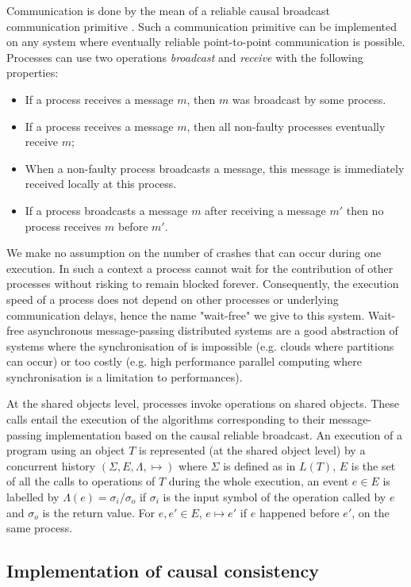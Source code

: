\documentclass[9pt,numbers]{sigplanconf}
\begin{document}
Communication is done by the mean of a reliable causal broadcast communication primitive \cite{HT93}. 
Such a communication primitive can be implemented on any system where eventually reliable point-to-point 
communication is possible. Processes can use two operations \emph{broadcast} and \emph{receive} with the 
following properties: 
\begin{itemize}
\item If a process receives a message $m$, then $m$ was broadcast by some process.
\item If a process receives a message $m$, then all non-faulty processes eventually receive $m$;
\item When a non-faulty process broadcasts a message, this message is immediately received locally at this process.
\item If a process broadcasts a message $m$ after receiving a message $m'$ then no process
receives $m$ before $m'$.
\end{itemize}

We make no assumption on the number of crashes that can occur during one execution.
In such a context a process cannot wait for the contribution of other processes 
without risking to remain blocked forever. Consequently, the execution speed of a 
process does not depend on other processes or underlying communication delays, hence 
the name "wait-free" we give to this system. Wait-free asynchronous message-passing 
distributed systems are a good abstraction of systems where the synchronisation of
is impossible (e.g. clouds where partitions can occur) or too costly 
(e.g. high performance parallel computing where synchronisation is a limitation to performances).

At the shared objects level, processes invoke operations on shared objects. These calls entail the execution of the algorithms corresponding to their message-passing implementation based on the causal reliable broadcast. An execution of a program using an object $T$ is represented (at the shared object level) by a concurrent history $(\Sigma, E, \Lambda, \mapsto)$ where $\Sigma$ is defined as in $L(T)$, $E$ is the set of all the calls to operations of $T$ during the whole execution, an event $e\in E$ is labelled by $\Lambda(e) = \sigma_i/\sigma_o$ if $\sigma_i$ is the input symbol of the operation called by $e$ and $\sigma_o$ is the return value. For $e, e'\in E$, $e\mapsto e'$ if $e$ happened before $e'$, on the same process.

\subsection{Implementation of causal consistency}
\end{document}
